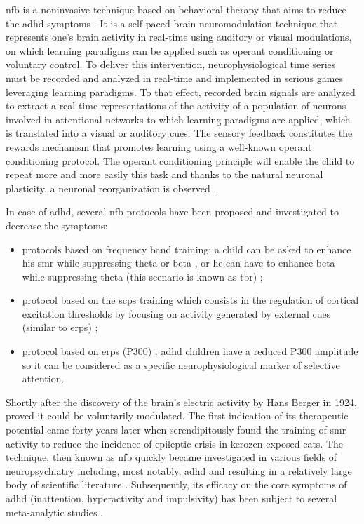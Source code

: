 \gls{nfb} is a noninvasive technique based on behavioral therapy that aims to reduce the \gls{adhd} symptoms \citep{Arns2015, Steffert2010}.
It is a self-paced brain neuromodulation technique that represents one's brain activity in real-time using auditory or 
visual modulations, on which learning paradigms can be applied such as operant conditioning or voluntary control.
To deliver this intervention, neurophysiological time series must be recorded and analyzed in real-time and implemented in serious games 
leveraging learning paradigms. To that effect, recorded brain signals are analyzed to extract a real time representations of the activity 
of a population of neurons involved in attentional networks to which learning paradigms are applied, which is translated into a visual 
or auditory cues. The sensory feedback constitutes the rewards mechanism that promotes learning using a well-known operant conditioning protocol. 
The operant conditioning principle will enable the child to repeat more and more easily this task and thanks to the natural neuronal plasticity,
a neuronal reorganization is observed \citep{VanDoren2017}. 

In case of \gls{adhd}, several \gls{nfb} protocols have been proposed and investigated to decrease the symptoms: 
\begin{itemize}
	\item protocols based on frequency band training: a child can be asked to enhance his \gls{smr} 
	while suppressing theta or beta \citep{Lubar1976}, or he can have to enhance beta
	while suppressing theta (this scenario is known as \gls{tbr}) \citep{Arns2013};
	\item protocol based on the \glspl{scp} training which consists in the regulation of cortical excitation 
	thresholds by focusing on activity generated by external cues 
	(similar to \glspl{erp}) \citep{Heinrich2004, Banaschewski2007}; 
	\item protocol based on \glspl{erp} (P300) \citep{Fouillen2017}: \gls{adhd} children have a reduced P300 
	amplitude so it can be considered as a specific neurophysiological marker of selective attention. 
\end{itemize} 

Shortly after the discovery of the brain's electric activity by Hans Berger in 1924, \citet{Durup1935} proved it could be voluntarily modulated. 
The first indication of its therapeutic potential came forty years later when \citet{Sterman1974} serendipitously found the training of \gls{smr} 
activity to reduce the incidence of epileptic crisis in kerozen-exposed cats. The technique, then known as \gls{nfb} quickly became investigated in 
various fields of neuropsychiatry including, most notably, \gls{adhd} and resulting in a relatively large body of scientific literature 
\citep{Lubar1976, Rossiter1995, Linden1996, Maurizio2014}. Subsequently, its efficacy on the core symptoms of \gls{adhd} (inattention, hyperactivity 
and impulsivity) has been subject to several meta-analytic studies \citep{Loo2005, Lofthouse2012, Arns2009, Micoulaud2014, Sonuga-Barke2013}. 

